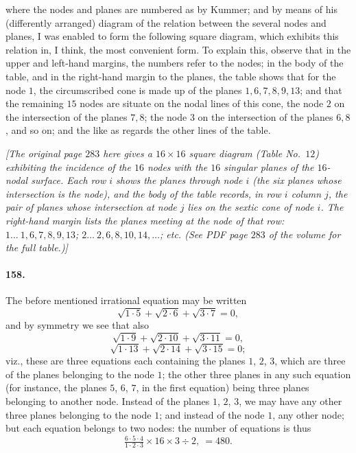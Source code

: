\documentclass[11pt,a4paper]{article}
\begin{document}
\noindent where the nodes and planes are numbered as by Kummer; and by
means of his (differently arranged) diagram of the relation between the
several nodes and planes, I was enabled to form the following square
diagram, which exhibits this relation in, I think, the most convenient
form. To explain this, observe that in the upper and left-hand margins,
the numbers refer to the nodes; in the body of the table, and in the
right-hand margin to the planes, the table shows that for the node $1$,
the circumscribed cone is made up of the planes $1, 6, 7, 8, 9, 13$; and
that the remaining $15$ nodes are situate on the nodal lines of this cone,
the node $2$ on the intersection of the planes $7, 8$; the node $3$ on
the intersection of the planes $6, 8$, and so on; and the like as regards
the other lines of the table.

\bigskip

\begin{center}
\textit{[The original page $283$ here gives a $16 \times 16$ square
diagram (Table No.~$12$) exhibiting the incidence of the $16$ nodes with
the $16$ singular planes of the $16$-nodal surface. Each row $i$ shows
the planes through node $i$ (the six planes whose intersection is the
node), and the body of the table records, in row $i$ column $j$, the pair
of planes whose intersection at node $j$ lies on the sextic cone of node
$i$. The right-hand margin lists the planes meeting at the node of that
row: $1\ldots\ 1, 6, 7, 8, 9, 13$; $2\ldots\ 2, 6, 8, 10, 14, \dotsc$;
\textit{etc.} (See PDF page $283$ of the volume for the full table.)]}
\end{center}

\bigskip

\paragraph{158.}
The before mentioned irrational equation may be written
\[
\sqrt{1 \cdot 5} + \sqrt{2 \cdot 6} + \sqrt{3 \cdot 7} = 0,
\]
and by symmetry we see that also
\[
\sqrt{1 \cdot 9} + \sqrt{2 \cdot 10} + \sqrt{3 \cdot 11} = 0,
\]
\[
\sqrt{1 \cdot 13} + \sqrt{2 \cdot 14} + \sqrt{3 \cdot 15} = 0;
\]
viz., these are three equations each containing the planes $1$, $2$, $3$,
which are three of the planes belonging to the node $1$; the other three
planes in any such equation (for instance, the planes $5$, $6$, $7$, in
the first equation) being three planes belonging to another node. Instead
of the planes $1$, $2$, $3$, we may have any other three planes belonging
to the node $1$; and instead of the node $1$, any other node; but each
equation belongs to two nodes: the number of equations is thus
\[
\tfrac{6 \cdot 5 \cdot 4}{1 \cdot 2 \cdot 3} \times 16 \times 3 \div 2,\ = 480.
\]
\end{document}
